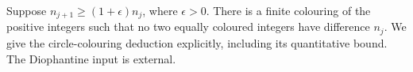 Suppose \(n_{j+1}\geq(1+\epsilon)n_j\), where \(\epsilon>0\).
There is a finite colouring of the positive integers such that
no two equally coloured integers have difference \(n_j\).
We give the circle-colouring deduction explicitly, including its
quantitative bound. The Diophantine input is external.
